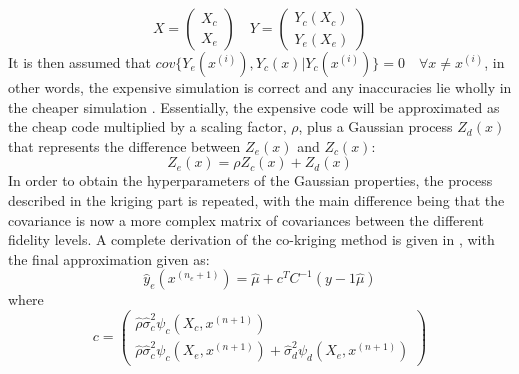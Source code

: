 \begin{equation*}
    X=\begin{pmatrix}
    X_c \\ X_e
    \end{pmatrix} \quad
    Y=\begin{pmatrix}
    Y_c\left (X_c \right)\\Y_e\left (X_e \right)
    \end{pmatrix}
\end{equation*}
It is then assumed that $cov\{Y_e(x^{(i)}),Y_c(x)|Y_c(x^{(i)})\}=0\quad \forall x\neq x^{(i)}$, in other words, the expensive simulation is correct and any inaccuracies lie wholly in the cheaper simulation \cite{kennedy2000predicting}. Essentially, the expensive code will be approximated as the cheap code multiplied by a scaling factor, $\rho$, plus a Gaussian process $Z_d(x)$ that represents the difference between $Z_e(x)$ and $Z_c(x)$:
\begin{equation}
    Z_e(x)=\rho Z_c(x)+Z_d(x)
\end{equation}
In order to obtain the hyperparameters of the Gaussian properties, the process described in the kriging part is repeated, with the main difference being that the covariance is now a more complex matrix of covariances between the different fidelity levels. A complete derivation of the co-kriging method is given in \cite{Forrester2007}, with the final approximation given as: 
\begin{equation}
    \hat{y}_e(x^{(n_e+1)})=\hat{\mu}+c^TC^{-1}(y-1\hat{\mu})
\end{equation}
where
\begin{equation*}
    c=\begin{pmatrix}
    \hat{\rho}\hat{\sigma}_{c}^{2}\psi_c\left(X_c, x^{(n+1)}\right) \\
    \hat{\rho}\hat{\sigma}_{c}^{2}\psi_c(X_e, x^{(n+1)})+\hat{\sigma}_{d}^{2}\psi_d\left(X_e,x^{(n+1)}\right) 
    \end{pmatrix}
\end{equation*}
